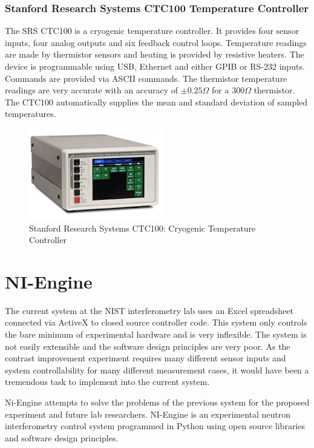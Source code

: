 \subsubsection{Stanford Research Systems CTC100 Temperature Controller}
The SRS CTC100 is a cryogenic temperature controller. It provides four sensor inputs, four analog outputs and six feedback control loops. Temperature readings are made by thermistor sensors and heating is provided by resistive heaters. The device is programmable using USB, Ethernet and either GPIB or RS-232 inputs. Commands are provided via ASCII commands.  
The thermistor temperature readings are very accurate with an accuracy of $\pm0.25\Omega$ for a $300\Omega$ thermistor. The CTC100 automatically supplies the mean and standard deviation of sampled temperatures. 
\begin{figure}[ht!]
\centering
\includegraphics[scale=1.0]{Figures/ctc100.jpg}
\caption{Stanford Research Systems CTC100: Cryogenic Temperature Controller}
\label{fig:ctc100}
\end{figure}
\section{NI-Engine}
The current system at the NIST interferometry lab uses an Excel spreadsheet connected via ActiveX to closed source controller code. This system only controls the bare minimum of experimental hardware and is very inflexible. The system is not easily extensible and the software design principles are very poor. As the contrast improvement experiment requires many different sensor inputs and system controllability for many different measurement cases, it would have been a tremendous task to implement into the current system. 

Ni-Engine attempts to solve the problems of the previous system for the proposed experiment and future lab researchers. NI-Engine is an experimental neutron interferometry control system programmed in Python using open source libraries and software design principles.
